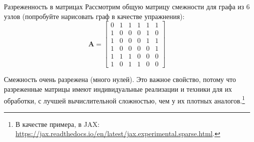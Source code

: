 \begin{supportbox}{Разреженность в матрицах}
Рассмотрим общую матрицу смежности для графа из 6 узлов (попробуйте нарисовать граф в качестве упражнения):
%
$$
\mathbf{A} = \begin{bmatrix} 0& 1& 1& 1& 1& 1\\1& 0& 0& 0& 1& 0\\1& 0& 0& 0& 1& 1\\1& 0& 0& 0& 0& 1\\1& 1& 1& 0& 0& 0\\1& 0& 1& 1& 0& 0\end{bmatrix}
$$

Смежность очень разрежена (много нулей). Это важное свойство, потому что разреженные матрицы имеют индивидуальные реализации и техники для их обработки, с лучшей вычислительной сложностью, чем у их плотных аналогов.\footnote{В качестве примера, в JAX: \url{https://jax.readthedocs.io/en/latest/jax.experimental.sparse.html}.}
\end{supportbox}

